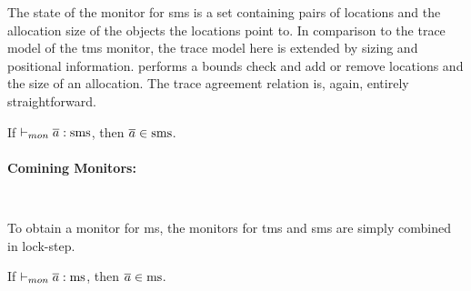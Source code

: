 \documentclass[acmsmall,review,screen,dvipsnames]{acmart}
\begin{document}
The state of the monitor for \gls{sms} is a set containing pairs of locations and the allocation size of the objects the locations point to.
In comparison to the trace model of the \gls{tms} monitor, the trace model here is extended by sizing and positional information.
 performs a bounds check and  add or remove locations and the size of an allocation.
The trace agreement relation is, again, entirely straightforward.

\begin{lemma}\label{lem:mon:smsafe}
  If $\vdash_{mon}{\overline{a}}:{\operatorname{sms}}$, then $\overline{a}\in\operatorname{sms}$.\Coqed
\end{lemma}

\paragraph{Comining Monitors: }

\begin{center}
  $\;$\\
\end{center}
\begin{center}
  $\;$\\
\end{center}

To obtain a monitor for \gls{ms}, the monitors for \gls{tms} and \gls{sms} are simply combined in lock-step.

\begin{lemma}\label{lem:mon:msafe}
  If $\vdash_{mon}{\overline{a}}:{\operatorname{ms}}$, then $\overline{a}\in\operatorname{ms}$.\Coqed
\end{lemma}
\end{document}
